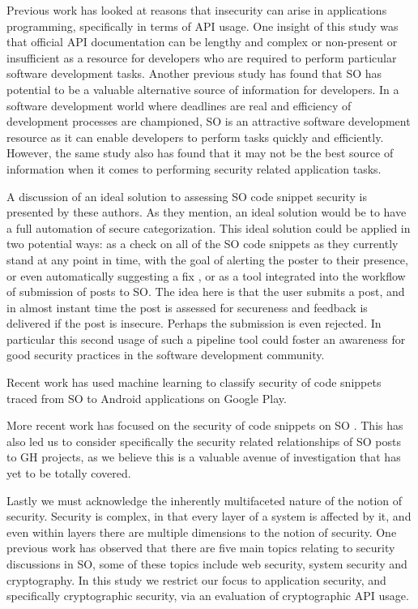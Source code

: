 \documentclass[10pt, conference]{IEEEtran}
\begin{document}
Previous work \cite{} has looked at reasons that insecurity can arise in applications programming, specifically in terms of API usage. One insight of this study was that official API documentation can be lengthy and complex or non-present or insufficient as a resource for developers who are required to perform particular software development tasks. Another previous study \cite{} has found that SO has potential to be a valuable alternative source of information for developers. In a software development world where deadlines are real and efficiency of development processes are championed, SO is an attractive software development resource as it can enable developers to perform tasks quickly and efficiently. However, the same study also has found that it may not be the best source of information when it comes to performing security related application tasks.


A discussion of an ideal solution to assessing SO code snippet security is presented by these authors. As they mention, an ideal solution would be to have a full automation of secure categorization. This ideal solution could be applied in two potential ways: as a check on all of the SO code snippets as they currently stand at any point in time, with the goal of alerting the poster to their presence, or even automatically suggesting a fix , or as a tool integrated into the workflow of submission of posts to SO. The idea here is that the user submits a post, and in almost instant time the post is assessed for secureness and feedback is delivered if the post is insecure. Perhaps the submission is even rejected. In particular this second usage of such a pipeline tool could foster an awareness for good security practices in the software development community.

 Recent work \cite{7958574} has used machine learning to classify security of code snippets traced from SO to Android applications on Google Play. 
 
 More recent work has focused on the security of code snippets on SO \cite{DBLP:journals/corr/abs-1901-01327}. This has also led us to consider specifically the security related relationships of SO posts to GH projects, as we believe this is a valuable avenue of investigation that has yet to be totally covered.
 
Lastly we must acknowledge the inherently multifaceted nature of the notion of security. Security is complex, in that every layer of a system is affected by it, and even within layers there are multiple dimensions to the notion of security. One previous work \cite{} has observed that there are five main topics relating to security discussions in SO, some of these topics include web security, system security and cryptography. In this study we restrict our focus to application security, and specifically cryptographic security, via an evaluation of cryptographic API usage.
\end{document}
